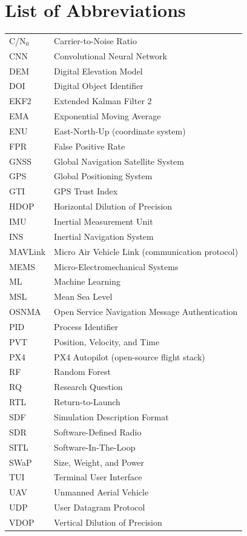 \chapter*{List of Abbreviations}

\begin{tabular}{ll}
C/N$_0$  & Carrier-to-Noise Ratio \\
CNN      & Convolutional Neural Network \\
DEM      & Digital Elevation Model \\
DOI      & Digital Object Identifier \\
EKF2     & Extended Kalman Filter 2 \\
EMA      & Exponential Moving Average \\
ENU      & East-North-Up (coordinate system) \\
FPR      & False Positive Rate \\
GNSS     & Global Navigation Satellite System \\
GPS      & Global Positioning System \\
GTI      & GPS Trust Index \\
HDOP     & Horizontal Dilution of Precision \\
IMU      & Inertial Measurement Unit \\
INS      & Inertial Navigation System \\
MAVLink  & Micro Air Vehicle Link (communication protocol) \\
MEMS     & Micro-Electromechanical Systems \\
ML       & Machine Learning \\
MSL      & Mean Sea Level \\
OSNMA    & Open Service Navigation Message Authentication \\
PID      & Process Identifier \\
PVT      & Position, Velocity, and Time \\
PX4      & PX4 Autopilot (open-source flight stack) \\
RF       & Random Forest \\
RQ       & Research Question \\
RTL      & Return-to-Launch \\
SDF      & Simulation Description Format \\
SDR      & Software-Defined Radio \\
SITL     & Software-In-The-Loop \\
SWaP     & Size, Weight, and Power \\
TUI      & Terminal User Interface \\
UAV      & Unmanned Aerial Vehicle \\
UDP      & User Datagram Protocol \\
VDOP     & Vertical Dilution of Precision \\
\end{tabular}

